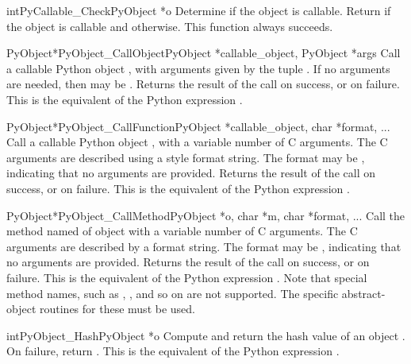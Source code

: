 \documentclass{manual}
\begin{document}
\begin{cfuncdesc}{int}{PyCallable_Check}{PyObject *o}
Determine if the object  is callable.  Return  if the
object is callable and  otherwise.
This function always succeeds.
\end{cfuncdesc}


\begin{cfuncdesc}{PyObject*}{PyObject_CallObject}{PyObject *callable_object,
                                                  PyObject *args}
Call a callable Python object , with
arguments given by the tuple .  If no arguments are
needed, then  may be \NULL{}.  Returns the result of the
call on success, or \NULL{} on failure.  This is the equivalent
of the Python expression .
\end{cfuncdesc}

\begin{cfuncdesc}{PyObject*}{PyObject_CallFunction}{PyObject *callable_object, char *format, ...}
Call a callable Python object , with a
variable number of C arguments. The C arguments are described
using a  style format string. The format may
be \NULL{}, indicating that no arguments are provided.  Returns the
result of the call on success, or \NULL{} on failure.  This is
the equivalent of the Python expression .
\end{cfuncdesc}


\begin{cfuncdesc}{PyObject*}{PyObject_CallMethod}{PyObject *o, char *m, char *format, ...}
Call the method named  of object  with a variable number
of C arguments.  The C arguments are described by a
 format string.  The format may be \NULL{},
indicating that no arguments are provided. Returns the result of the
call on success, or \NULL{} on failure.  This is the equivalent of the
Python expression .
Note that special method names, such as ,
, and so on are not supported.  The specific
abstract-object routines for these must be used.
\end{cfuncdesc}


\begin{cfuncdesc}{int}{PyObject_Hash}{PyObject *o}
Compute and return the hash value of an object .  On
failure, return .  This is the equivalent of the Python
expression .
\end{cfuncdesc}
\end{document}
